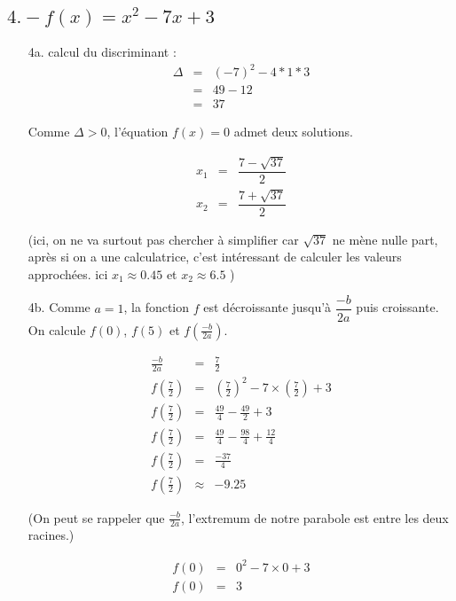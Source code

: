 \documentclass[11pt]{article}
\begin{document}
\newpage
\subsection{$4. - f(x) = x^2 - 7x + 3$}

\begin{enumerate}

\item[4a.]
  calcul du discriminant :
  \begin{eqnarray*}
    \Delta &=& (-7)^2 - 4*1*3\\
    &=& 49 - 12\\
    &=& 37
  \end{eqnarray*}

  Comme $\Delta > 0$, l'équation $f(x) =0 $ admet deux solutions.

  \begin{eqnarray*}
    x_1 &=& \dfrac{7 - \sqrt{37}}{2} \\
    x_2 &=& \dfrac{7 + \sqrt{37}}{2}
  \end{eqnarray*}

  (ici, on ne va surtout pas chercher à simplifier car $\sqrt{37}$ ne mène nulle part, après si on a une calculatrice, c'est intéressant de calculer les valeurs approchées. ici $x_1 \approx 0.45$ et $x_2 \approx 6.5$ )

\item[4b.] Comme $a = 1$, la fonction $f$ est décroissante jusqu'à $\dfrac{-b}{2a}$ puis croissante.\\

  On calcule $f(0)$, $f(5)$ et $f(\frac{-b}{2a})$.

  \begin{multicols}{2}
    \begin{eqnarray*}
      \frac{-b}{2a} &=& \frac{7}{2} \\
      f(\frac{7}{2}) &=& (\frac{7}{2})^2 -7 \times (\frac{7}{2}) + 3 \\
      f(\frac{7}{2}) &=& \frac{49}{4} - \frac{49}{2} + 3 \\
      f(\frac{7}{2}) &=& \frac{49}{4} - \frac{98}{4} + \frac{12}{4} \\
      f(\frac{7}{2}) &=& \frac{-37}{4}  \\
      f(\frac{7}{2}) &\approx& -9.25
    \end{eqnarray*}

    (On peut se rappeler que $\frac{-b}{2a}$, l'extremum de notre parabole est entre les deux racines.)

    \begin{eqnarray*}
      f(0) &=& 0^2 -7 \times 0 + 3 \\
      f(0) &=& 3
    \end{eqnarray*}


\end{multicols}
\end{enumerate}
\end{document}
